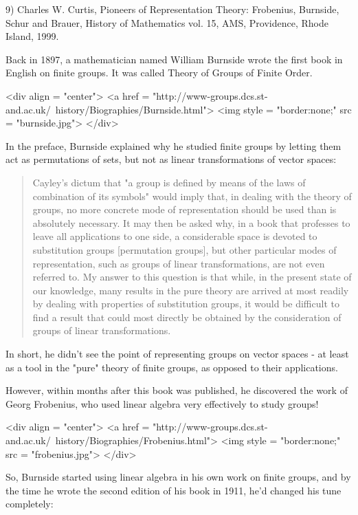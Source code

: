9) Charles W. Curtis, Pioneers of Representation Theory: Frobenius,
Burnside, Schur and Brauer, History of Mathematics vol. 15, AMS,
Providence, Rhode Island, 1999.

Back in 1897, a mathematician named William Burnside wrote the first
book in English on finite groups.  It was called Theory of Groups of 
Finite Order.  

<div align = "center">
<a href = "http://www-groups.dcs.st-and.ac.uk/~history/Biographies/Burnside.html">
<img style = "border:none;" src = "burnside.jpg">
</div>

In the preface, Burnside explained why he studied finite 
groups by letting them act as permutations of sets, but not as 
linear transformations of vector spaces:

\begin{quote}
   Cayley's dictum that "a group is defined by means of the laws of
   combination of its symbols" would imply that, in dealing with the
   theory of groups, no more concrete mode of representation should be
   used than is absolutely necessary.  It may then be asked why, in 
   a book that professes to leave all applications to one side, a 
   considerable space is devoted to substitution groups [permutation
   groups], but other particular modes of representation, such as 
   groups of linear transformations, are not even referred to.  My
   answer to this question is that while, in the present state of our
   knowledge, many results in the pure theory are arrived at most 
   readily by dealing with properties of substitution groups, it 
   would be difficult to find a result that could most directly be 
   obtained by the consideration of groups of linear transformations.
\end{quote}

In short, he didn't see the point of representing groups on vector 
spaces - at least as a tool in the "pure" theory of finite
groups, as opposed to their applications.

However, within months after this book was published, he discovered
the work of Georg Frobenius, who used linear algebra very effectively to
study groups! 

<div align = "center">
<a href = "http://www-groups.dcs.st-and.ac.uk/~history/Biographies/Frobenius.html">
<img style = "border:none;" src = "frobenius.jpg">
</div>

So, Burnside started using linear algebra in his own work on 
finite groups, and by the time he wrote the second edition of his 
book in 1911, he'd changed his tune completely:

